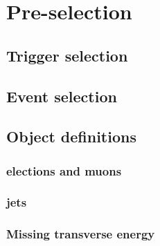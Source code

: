 \chapter{Pre-selection}
\label{ch:preselection}

\section{Trigger selection}

\section{Event selection}

\section{Object definitions}
\subsection{elections and muons}
\subsection{jets}
\subsection{Missing transverse energy}
